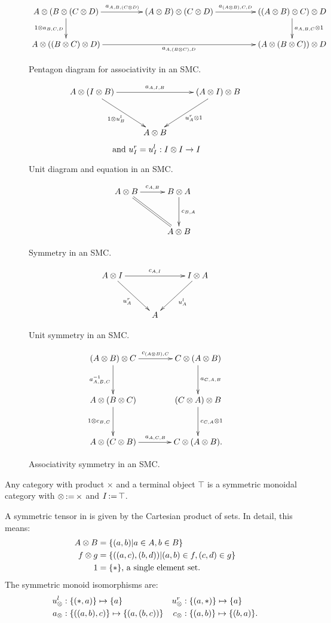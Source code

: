 \begin{figure}[!htbp]
\[
  \xymatrix@C+25pt{
    A\*(B\*(C\*D) \ar[r]^{a_{A,B,(C\*D)}} \ar[d]_{1\*a_{B,C,D}}
      & (A\*B)\*(C\*D) \ar[r]^{a_{(A\*B),C,D}}
      & ((A\*B)\*C)\*D \ar[d]^{a_{A,B,C}\*1}\\
    A\*((B\*C)\*D) \ar[rr]_{a_{A,(B\*C),D}}
      && (A\*(B\*C))\*D
  }
\]
\caption{Pentagon diagram for associativity in an SMC.}\label{fig:SMC_pentagon}
\end{figure}
\begin{figure}[!htbp]
\[
  \xymatrix@C+5pt@R+10pt{
    A\*(I\*B) \ar[rr]^{a_{A,I,B}} \ar[dr]_{1\*u^l_B}
      && (A\*I)\*B \ar[dl]^{u^r_A \* 1}\\
      &A\*B
  }
\]
\[\text{ and } u^r_I = u^l_I: I\otimes I \to I\]
\caption{Unit diagram and equation in an SMC.}\label{fig:SMC_unit}
\end{figure}
\begin{figure}[!htbp]
\[
  \xymatrix@C+5pt@R+10pt{
    A\*B \ar[r]^{c_{A,B}} \ar@{=}[dr]
      & B\*A \ar[d]^{c_{B,A}}\\
      &A\*B
  }
\]
\caption{Symmetry in an SMC.}\label{fig:SMC_commutes}
\end{figure}
\begin{figure}[!htbp]
\[
  \xymatrix@C+5pt@R+10pt{
    A\*I \ar[rr]^{c_{A,I}} \ar[dr]_{u^r_A}
      && I\*A \ar[dl]^{u^l_A}\\
      &A
  }
\]
\caption{Unit symmetry in an SMC.}\label{fig:SMC_unit_symmettry}
\end{figure}
\begin{figure}[!htbp]
\[
  \xymatrix@C+15pt@R+10pt{
    (A\*B)\*C \ar[r]^{c_{(A\*B),C}} \ar[d]_{a^{-1}_{A,B,C}}
      & C\*(A\*B) \ar[d]^{a_{C,A,B}}\\
    A\*(B\*C) \ar[d]_{1\*c_{B,C}}
      & (C\*A)\*B \ar[d]^{c_{C,A}\*1}\\
    A\*(C\*B) \ar[r]^{a_{A,C,B}}
      & C\*(A\*B).
  }
\]
\caption{Associativity symmetry in an SMC.}\label{fig:SMC_associativity_symmetry}
\end{figure}
\begin{example}
  Any category \D with product $\times$ and a terminal object $\top$ is a symmetric monoidal
  category with $\otimes \operatorname*{:\!=} \times$ and $I \operatorname*{:\!=} \top$.
\end{example}
\begin{example}\label{ex:pinj-has-a-smt}
  A symmetric tensor in \pinj is given by the Cartesian product of sets. In detail, this means:
  \begin{align*}
    A \otimes B &= \{(a,b)| a\in A, b\in B\}\\
    f \otimes g &= \{((a,c),(b,d)) | (a,b) \in f, (c,d) \in g\}\\
    1 & = \{*\}\text{, a single element set.}
  \end{align*}
  The symmetric monoid isomorphisms are:
    \begin{align*}
      u_{\otimes}^l &: \{(*,a)\} \mapsto \{a\}
      &u_{\otimes}^r &: \{(a,*)\} \mapsto \{a\}\\
      a_{\otimes} &: \{((a,b),c)\} \mapsto \{(a,(b,c))\}
      &c_{\otimes} &: \{(a,b)\} \mapsto \{(b,a)\}.
    \end{align*}
\end{example}
